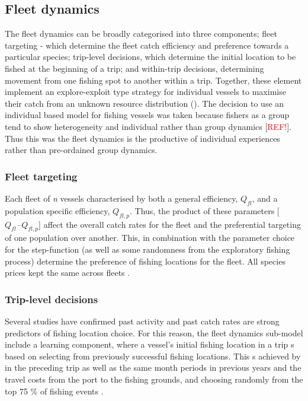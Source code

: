 \documentclass[review]{elsarticle}
\begin{document}
\subsection{Fleet dynamics}

The fleet dynamics can be broadly categorised into three components; fleet
targeting - which determine the fleet catch efficiency
and preference towards a particular species; trip-level decisions, which
determine the initial location to be fished at the beginning of
a trip; and within-trip decisions, determining movement from one fishing spot
to another within a trip. Together, these element implement an explore-exploit
type strategy for individual vessels to maximise their catch from an unknown
resource distribution (\cite{Bailey2018}). The decision to use an individual
based model for fishing vessels was taken because fishers as a group tend to
show heterogeneity and individual rather than group dynamics
[\textcolor{red}{REF!}]. Thus this was the fleet dynamics is the productive of
individual experiences rather than pre-ordained group dynamics. 

\subsubsection{Fleet targeting}

Each fleet of \textit{n} vessels  characterised by
both a general efficiency, $Q_{fl}$, and a population specific efficiency,
${Q_{fl, p}}$.  Thus, the product of these parameters [$Q_{fl} \cdot Q_{fl,
	p}$] affect the overall catch rates for the
fleet and the preferential targeting of one population over another. This, in
combination with the parameter choice for the step-function
 (as well as some randomness from the exploratory
fishing process) determine the preference of fishing
locations for the fleet.  All species prices  kept
the same across fleets .  

\subsubsection{Trip-level decisions}

Several studies \citep[e.g.][]{Hutton2004, Tidd2012, Girardin2015} have
confirmed past activity and past catch rates are strong predictors of fishing
location choice. For this reason, the fleet dynamics sub-model
include a learning component, where a vessel's initial
fishing location in a trip s based on selecting from
previously successful fishing locations. This s achieved
by  in the preceding trip as well as the same month
periods in previous years and the travel costs from the port to the fishing
grounds, and choosing randomly from the top 75 \% of fishing events
. 
\end{document}
